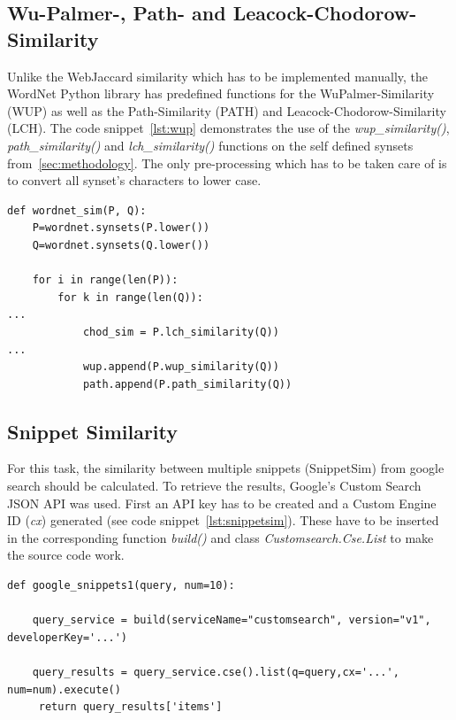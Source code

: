 \documentclass[conference]{IEEEtran}
\begin{document}
\subsection{Wu-Palmer-, Path- and Leacock-Chodorow-Similarity}\label{subsec:wup}
Unlike the WebJaccard similarity which has to be implemented manually, the WordNet Python library has predefined functions for the WuPalmer-Similarity (WUP) as well as the Path-Similarity (PATH) and Leacock-Chodorow-Similarity (LCH). The code snippet~\ref{lst:wup} demonstrates the use of the \textit{wup\_similarity()}, \textit{path\_similarity()} and \textit{lch\_similarity()} functions on the self defined synsets from~\ref{sec:methodology}. The only pre-processing which has to be taken care of is to convert all synset's characters to lower case.

\begin{lstlisting}[frame=single, label=lst:wup, caption={Use of WUP, PATH and LCH}, captionpos=b]
def wordnet_sim(P, Q):
    P=wordnet.synsets(P.lower())
    Q=wordnet.synsets(Q.lower())

    for i in range(len(P)):
        for k in range(len(Q)):
...
            chod_sim = P.lch_similarity(Q))
...
            wup.append(P.wup_similarity(Q))
            path.append(P.path_similarity(Q))
\end{lstlisting}

\subsection{Snippet Similarity}\label{subsec:wup}

For this task, the similarity between multiple snippets (SnippetSim)  from google search should be calculated. To retrieve the results, Google's Custom Search JSON API was used. First an API key has to be created and a Custom Engine ID (\textit{cx}) generated (see code snippet~\ref{lst:snippetsim}). These have to be inserted in the corresponding function \textit{build()} and class \textit{Customsearch.Cse.List} to make the source code work.

\begin{lstlisting}[frame=single, label=lst:snippetsim, caption={Connection to Google Search API}, captionpos=b]
def google_snippets1(query, num=10):

    query_service = build(serviceName="customsearch", version="v1", developerKey='...')

    query_results = query_service.cse().list(q=query,cx='...', num=num).execute()
     return query_results['items']
\end{lstlisting}
\end{document}
